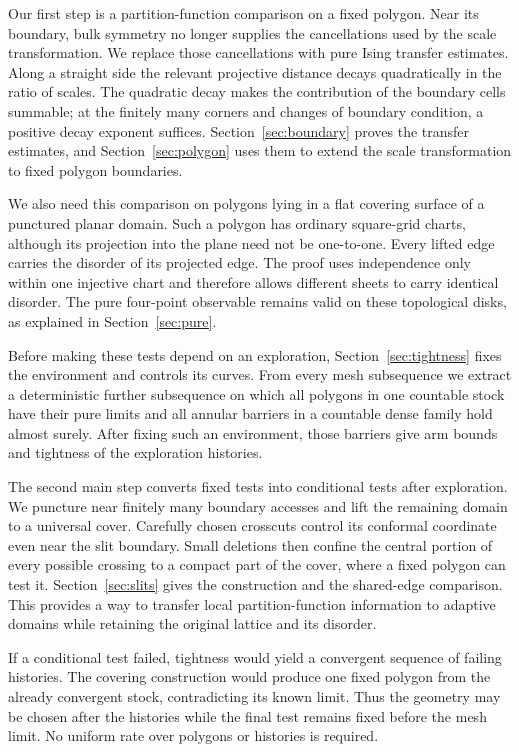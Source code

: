 Our first step is a partition-function comparison on a fixed polygon.
Near its boundary, bulk symmetry no longer supplies the cancellations
used by the scale transformation. We replace those cancellations with
pure Ising transfer estimates. Along a straight side the relevant
projective distance decays quadratically in the ratio of scales. The
quadratic decay makes the contribution of the boundary cells summable;
at the finitely many corners and changes of boundary condition, a
positive decay exponent suffices. Section~\ref{sec:boundary} proves the
transfer estimates, and Section~\ref{sec:polygon} uses them to extend the
scale transformation to fixed polygon boundaries.

We also need this comparison on polygons lying in a flat covering surface
of a punctured planar domain. Such a polygon has ordinary square-grid
charts, although its projection into the plane need not be one-to-one.
Every lifted edge carries the disorder of its projected edge. The proof
uses independence only within one injective chart and therefore allows
different sheets to carry identical disorder. The pure four-point
observable remains valid on these topological disks, as explained in
Section~\ref{sec:pure}.

Before making these tests depend on an exploration,
Section~\ref{sec:tightness} fixes the environment and controls its curves.
From every mesh subsequence we extract a deterministic further subsequence
on which all polygons in one countable stock have their pure limits and
all annular barriers in a countable dense family hold almost surely.
After fixing such an
environment, those barriers give arm bounds and tightness of the
exploration histories.

The second main step converts fixed tests into conditional tests after
exploration. We puncture near finitely many boundary accesses and lift
the remaining domain to a universal cover. Carefully chosen crosscuts
control its conformal coordinate even near the slit boundary. Small
deletions then confine the central portion of every possible crossing to
a compact part of the cover, where a fixed polygon can test it.
Section~\ref{sec:slits} gives the construction
and the shared-edge comparison. This provides a way to transfer local
partition-function information to adaptive domains while retaining the
original lattice and its disorder.

If a conditional test failed, tightness would yield a convergent sequence
of failing histories. The covering construction would produce one fixed
polygon from the already convergent stock, contradicting its known limit.
Thus the geometry may be chosen after the histories while the final test
remains fixed before the mesh limit. No uniform rate over polygons or
histories is required.

